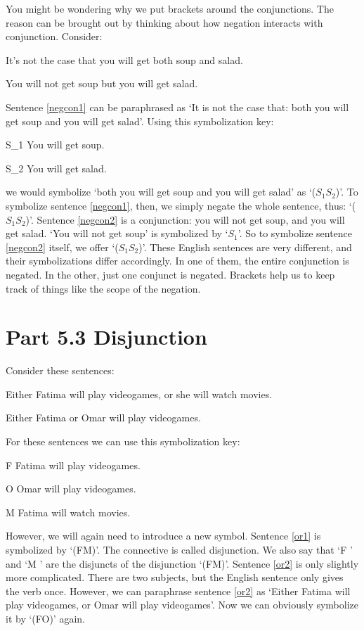 You might be wondering why we put brackets around the conjunctions. The reason can be brought out by thinking about how negation interacts with conjunction. Consider:
	\begin{earg}
		\item[\ex{negcon1}] It's not the case that you will get both soup and salad.
		\item[\ex{negcon2}] You will not get soup but you will get salad.
	\end{earg}
Sentence \ref{negcon1} can be paraphrased as ‘It is not the case that: both you will get soup and you will get salad’. Using this symbolization key:
	\begin{ekey}
		\item[S_1] You will get soup.
		\item[S_2] You will get salad.
	\end{ekey}
we would symbolize ‘both you will get soup and you will get salad’ as ‘($S_1$\eand $S_2$)’. To symbolize sentence  \ref{negcon1}, then, we simply negate the whole sentence, thus: ‘\enot ($S_1$\eand $S_2$)’.
Sentence \ref{negcon2} is a conjunction: you will not get soup, and you will get salad. ‘You will not get soup’ is symbolized by ‘\enot $S_1$’. So to symbolize sentence  \ref{negcon2} itself, we offer ‘(\enot $S_1$\eand $S_2$)’. These English sentences are very different, and their symbolizations differ accordingly. In one of them, the entire conjunction is negated. In the other, just one conjunct is negated. Brackets help us to keep track of things like the scope of the negation.
\section{Part 5.3 Disjunction}
\label{s:Part 5.3 Disjunction}
Consider these sentences:
	\begin{earg}
		\item[\ex{or1}]Either Fatima will play videogames, or she will watch movies.
		\item[\ex{or2}]Either Fatima or Omar will play videogames.
	\end{earg}
For these sentences we can use this symbolization key:
	\begin{ekey}
		\item[F] Fatima will play videogames.
		\item[O] Omar will play videogames.
		\item[M] Fatima will watch movies.
	\end{ekey}
However, we will again need to introduce a new symbol. Sentence \ref{or1} is symbolized by ‘(F\eor M)’. The connective is called \gls{disjunction}. We also say that ‘F ’ and ‘M ’ are the \glspl{disjunct} of the disjunction ‘(F\eor M)’.
Sentence \ref{or2} is only slightly more complicated. There are two subjects, but the English sentence only gives the verb once. However, we can paraphrase sentence \ref{or2} as ‘Either Fatima will play videogames, or Omar will play videogames’. Now we can obviously symbolize it by ‘(F\eor O)’ again.

